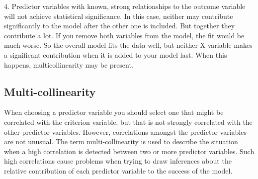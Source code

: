 \documentclass[]{report}
\begin{document}
4. Predictor variables with known, strong relationships to the outcome variable will not achieve statistical significance. In this case, neither may contribute significantly to the model after the other one is included. But together they contribute a lot. If you remove both variables from the model, the fit would be much worse. So the overall model fits the data well, but neither X variable makes a significant contribution when it is added to your model last. When this happens, multicollinearity may be present.

%
%
%
%
%
%


\subsection{Multi-collinearity}
When choosing a predictor variable you should select one that might be correlated with the criterion variable, but that is not strongly correlated with the other predictor variables. However, correlations amongst the predictor variables are not unusual. The term multi-collinearity  is used to describe the situation
when a high correlation is detected between two or more predictor variables.
Such high correlations cause problems when trying to draw inferences about the relative contribution of each predictor variable to the success of the model. 
\end{document}
